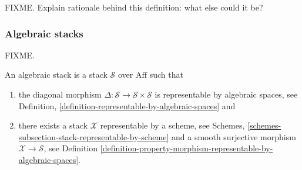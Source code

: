 \noindent
FIXME. Explain rationale behind this definition: what else could it be?


\subsubsection{Algebraic stacks}
\label{subsubsection-algebraic-stacks}

\noindent
FIXME.

\begin{definition}
An algebraic stack is a stack $\mathcal{S}$ over $\text{Aff}$ such that
\begin{enumerate}
\item the diagonal morphism
$\Delta : \mathcal{S} \to \mathcal{S}\times\mathcal{S}$
is representable by algebraic spaces, see Definition,
\autoref{definition-representable-by-algebraic-spaces} and
\item there exists a stack $\mathcal{X}$ representable by a scheme, see
Schemes, \autoref{schemes-subsection-stack-representable-by-scheme}
and a smooth surjective morphism $\mathcal{X} \to \mathcal{S}$,
see Definition
\ref{definition-property-morphism-representable-by-algebraic-spaces}.
\end{enumerate}
\end{definition}







